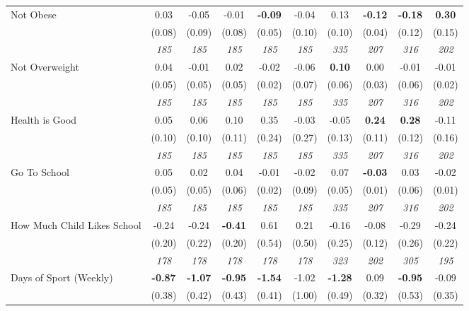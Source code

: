 \begin{tabular}{l c c c c c c c c c}
Not Obese & 0.03 & -0.05 & -0.01 & \textbf{-0.09} & -0.04 & 0.13 & \textbf{-0.12} & \textbf{ -0.18 } & \textbf{0.30} \\
& (0.08) & (0.09) & (0.08) & (0.05) & (0.10) & (0.10) & (0.04) & (0.12) & (0.15) \\
& \textit{ 185 } & \textit{ 185 } & \textit{ 185 } & \textit{ 185 } & \textit{ 185 } & \textit{ 335 } & \textit{ 207 } & \textit{ 316 } & \textit{ 202 } \\
Not Overweight & 0.04 & -0.01 & 0.02 & -0.02 & -0.06 & \textbf{ 0.10 } & 0.00 & -0.01 & -0.01 \\
& (0.05) & (0.05) & (0.05) & (0.02) & (0.07) & (0.06) & (0.03) & (0.06) & (0.02) \\
& \textit{ 185 } & \textit{ 185 } & \textit{ 185 } & \textit{ 185 } & \textit{ 185 } & \textit{ 335 } & \textit{ 207 } & \textit{ 316 } & \textit{ 202 } \\
Health is Good & 0.05 & 0.06 & 0.10 & 0.35 & -0.03 & -0.05 & \textbf{0.24} & \textbf{ 0.28 } & -0.11 \\
& (0.10) & (0.10) & (0.11) & (0.24) & (0.27) & (0.13) & (0.11) & (0.12) & (0.16) \\
& \textit{ 185 } & \textit{ 185 } & \textit{ 185 } & \textit{ 185 } & \textit{ 185 } & \textit{ 335 } & \textit{ 207 } & \textit{ 316 } & \textit{ 202 } \\
Go To School & 0.05 & 0.02 & 0.04 & -0.01 & -0.02 & 0.07 & \textbf{-0.03} & 0.03 & -0.02 \\
& (0.05) & (0.05) & (0.06) & (0.02) & (0.09) & (0.05) & (0.01) & (0.06) & (0.01) \\
& \textit{ 185 } & \textit{ 185 } & \textit{ 185 } & \textit{ 185 } & \textit{ 185 } & \textit{ 335 } & \textit{ 207 } & \textit{ 316 } & \textit{ 202 } \\
How Much Child Likes School & -0.24 & -0.24 & \textbf{ -0.41 } & 0.61 & 0.21 & -0.16 & -0.08 & -0.29 & -0.24 \\
& (0.20) & (0.22) & (0.20) & (0.54) & (0.50) & (0.25) & (0.12) & (0.26) & (0.22) \\
& \textit{ 178 } & \textit{ 178 } & \textit{ 178 } & \textit{ 178 } & \textit{ 178 } & \textit{ 323 } & \textit{ 202 } & \textit{ 305 } & \textit{ 195 } \\
Days of Sport (Weekly) & \textbf{ -0.87 } & \textbf{ -1.07 } & \textbf{ -0.95 } & \textbf{-1.54} & -1.02 & \textbf{ -1.28 } & 0.09 & \textbf{ -0.95 } & -0.09 \\
& (0.38) & (0.42) & (0.43) & (0.41) & (1.00) & (0.49) & (0.32) & (0.53) & (0.35) \\

\end{tabular}
